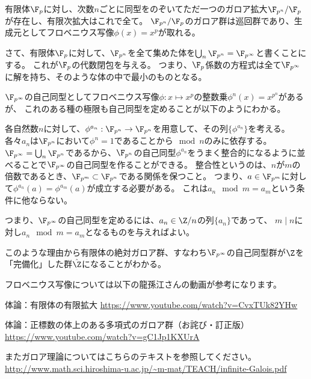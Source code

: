 \documentclass[uplatex]{jsarticle}
\begin{document}
\begin{prop}
  有限体$\F_p$に対し、次数$n$ごとに同型をのぞいてただ一つのガロア拡大$\F_{p^n}/\F_p$が存在し、有限次拡大はこれで全て。
  $\F_{p^n}/\F_p$のガロア群は巡回群であり、生成元としてフロベニウス写像$\phi(x)=x^p$が取れる。
\end{prop}

さて、有限体$\F_p$に対して、$\F_{p^n}$を全て集めた体を$\bigcup_{n}\F_{p^n}=\F_{p^\infty}$と書くことにする。
これが$\F_p$の代数閉包を与える。
つまり、$\F_p$係数の方程式は全て$\F_{p^\infty}$に解を持ち、そのような体の中で最小のものとなる。

$\F_{p^\infty}$の自己同型としてフロベニウス写像$\phi:x\mapsto x^p$の整数乗$\phi^n(x)=x^{p^n}$があるが、
これのある種の極限も自己同型を定めることが以下のようにわかる。

各自然数$n$に対して、$\phi^{a_n}:\F_{p^n}\to\F_{p^n}$を用意して、その列$\{\phi^{a_n}\}$を考える。
各々$a_n$は$\F_{p^n}$において$\phi^n=1$であることから$\mod n$のみに依存する。
$\F_{p^\infty}=\bigcup_n\F_{p^n}$であるから、$\F_{p^n}$の自己同型$\phi^{a_n}$をうまく整合的になるように並べることで$\F_{p^\infty}$の自己同型を作ることができる。
整合性というのは、$n$が$m$の倍数であるとき、$\F_{p^m}\subset\F_{p^n}$である関係を保つこと。
つまり、$a\in\F_{p^m}$に対して$\phi^{a_n}(a)=\phi^{a_m}(a)$が成立する必要がある。
これは$a_n\mod m=a_m$という条件に他ならない。

つまり、$\F_{p^\infty}$の自己同型を定めるには、$a_n\in\Z/n$の列$\{a_n\}$であって、
$m\mid n$に対し$a_n\mod m=a_m$となるものを与えればよい。

このような理由から有限体の絶対ガロア群、すなわち$\F_{p^\infty}$の自己同型群が$\Z$を「完備化」した群$\hat{\Z}$になることがわかる。

フロベニウス写像については以下の龍孫江さんの動画が参考になります。

体論：有限体の有限拡大
\url{https://www.youtube.com/watch?v=CvxTUk82YHw}

体論：正標数の体上のある多項式のガロア群（お詫び・訂正版）
\url{https://www.youtube.com/watch?v=gC1Jp1KXUrA}

またガロア理論についてはこちらのテキストを参照してください。
\url{http://www.math.sci.hiroshima-u.ac.jp/~m-mat/TEACH/infinite-Galois.pdf}
\end{document}
